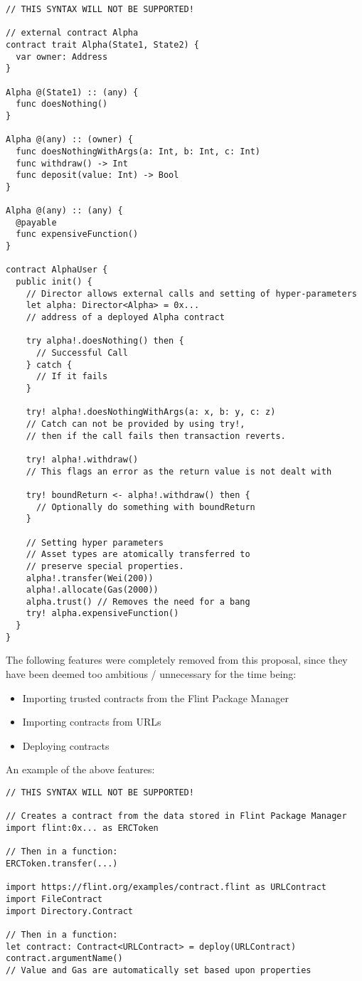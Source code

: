 \begin{verbatim}
// THIS SYNTAX WILL NOT BE SUPPORTED!

// external contract Alpha
contract trait Alpha(State1, State2) {
  var owner: Address
}

Alpha @(State1) :: (any) {
  func doesNothing()
}

Alpha @(any) :: (owner) {
  func doesNothingWithArgs(a: Int, b: Int, c: Int)
  func withdraw() -> Int
  func deposit(value: Int) -> Bool
}

Alpha @(any) :: (any) {
  @payable
  func expensiveFunction()
}

contract AlphaUser {
  public init() {
    // Director allows external calls and setting of hyper-parameters
    let alpha: Director<Alpha> = 0x...
    // address of a deployed Alpha contract
    
    try alpha!.doesNothing() then {
      // Successful Call
    } catch {
      // If it fails
    }
    
    try! alpha!.doesNothingWithArgs(a: x, b: y, c: z)
    // Catch can not be provided by using try!,
    // then if the call fails then transaction reverts.
    
    try! alpha!.withdraw()
    // This flags an error as the return value is not dealt with
    
    try! boundReturn <- alpha!.withdraw() then {
      // Optionally do something with boundReturn
    }
    
    // Setting hyper parameters
    // Asset types are atomically transferred to
    // preserve special properties.
    alpha!.transfer(Wei(200))
    alpha!.allocate(Gas(2000))
    alpha.trust() // Removes the need for a bang
    try! alpha.expensiveFunction()
  }
}
\end{verbatim}

The following features were completely removed from this proposal, since they have been deemed too ambitious / unnecessary for the time being:

\begin{itemize}
	\item Importing trusted contracts from the Flint Package Manager
	\item Importing contracts from URLs
	\item Deploying contracts
\end{itemize}

An example of the above features:

\begin{verbatim}
// THIS SYNTAX WILL NOT BE SUPPORTED!

// Creates a contract from the data stored in Flint Package Manager
import flint:0x... as ERCToken

// Then in a function:
ERCToken.transfer(...)

import https://flint.org/examples/contract.flint as URLContract
import FileContract
import Directory.Contract

// Then in a function:
let contract: Contract<URLContract> = deploy(URLContract)
contract.argumentName()
// Value and Gas are automatically set based upon properties
\end{verbatim}